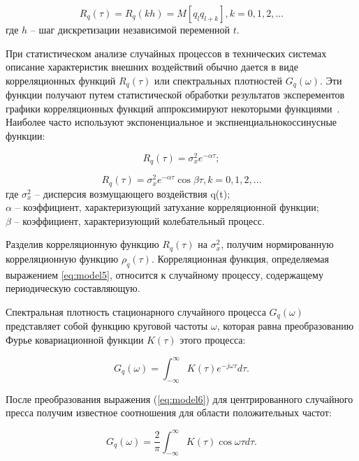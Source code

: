 \begin{equation} \label{eq:model3}
{R}_{q}(\tau) = {R}_{q}(kh) = M[q_l q_{l+k}], k=0,1,2,...
\end{equation}
где $h$ – шаг дискретизации независимой переменной $t$.

При статистическом анализе случайных процессов в технических системах
описание характеристик внешних воздействий обычно дается в виде
корреляционных функций ${R}_{q}(\tau)$ или спектральных плотностей $G_q(\omega)$. Эти
функции получают путем статистической обработки результатов эксперементов
графики корреляционных функций аппроксимируют некоторыми функциями~\cite{modeling:2004}. Наиболее часто используют экспоненциальное и экспненциальнокоссинусные функции:


\begin{equation} \label{eq:model4}
{R}_{q}(\tau) = {\sigma}_{x}^{2} e^{-\alpha \tau};
\end{equation}

\begin{equation} \label{eq:model5}
{R}_{q}(\tau) = {\sigma}_{x}^{2} e^{-\alpha \tau} \cos\beta\tau, k=0,1,2,...
\end{equation}
где ${\sigma}_{x}^{2}$ -- дисперсия возмущающего воздействия q(t);\\
$\alpha$ -- коэффициент, характеризующий затухание корреляционной функции;\\
$\beta$ -- коэффициент, характеризующий колебательный процесс.


Разделив корреляционную функцию ${R}_{q}(\tau)$ на ${\sigma}_{x}^{2}$, получим нормированную
корреляционную функцию ${\rho}_{q}(\tau)$. Корреляционная функция, определяемая
выражением \ref{eq:model5}, относится к случайному процессу, содержащему
периодическую составляющую.

Спектральная плотность стационарного случайного процесса $G_q(\omega)$
представляет собой функцию круговой частоты $\omega$, которая равна
преобразованию Фурье ковариационной функции $K(\tau)$ этого процесса:

\begin{equation} \label{eq:model6}
G_q(\omega) = \int_{-\infty}^{\infty} K(\tau) e^{-j\omega\tau} d\tau.
\end{equation}

После преобразования выражения (\ref{eq:model6}) для центрированного случайного
пресса получим известное соотношения для области положительных частот:

\begin{equation} \label{eq:model7}
G_q(\omega) = \frac{2}{\pi}\int_{-\infty}^{\infty} K(\tau) \cos\omega\tau d\tau.
\end{equation}

